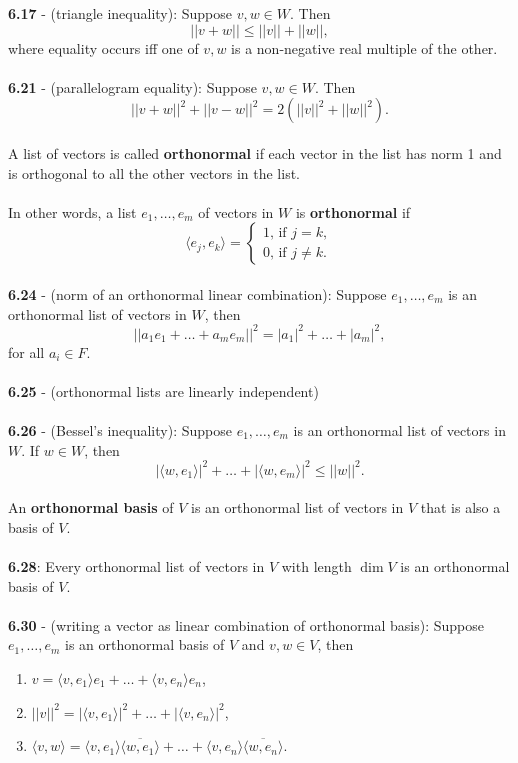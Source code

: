 \documentclass{article}
\DeclareMathOperator{\Dim}{dim}
\theoremstyle{definition}
\begin{document}
\textbf{6.17} - (triangle inequality): Suppose $v, w \in W$. Then $$||v + w|| \leq ||v|| + ||w||,$$ where equality occurs iff one of $v, w$ is a non-negative real multiple of the other. \\ \\
\textbf{6.21} - (parallelogram equality): Suppose $v, w \in W$. Then $$||v + w||^2 + ||v - w||^2 = 2(||v||^2 + ||w||^2).$$ \\
A list of vectors is called \textbf{orthonormal} if each vector in the list has norm 1 and is orthogonal to all the other vectors in the list. \\ \\
In other words, a list $e_1, \dots, e_m$ of vectors in $W$ is \textbf{orthonormal} if $$\langle e_j, e_k \rangle = \begin{cases} 1 \text{, if } j = k, \\
0 \text{, if } j \neq k.
\end{cases}$$ \\
\textbf{6.24} - (norm of an orthonormal linear combination): Suppose $e_1, \dots, e_m$ is an orthonormal list of vectors in $W$, then $$||a_1e_1 + \dots + a_me_m||^2 = |a_1|^2 + \dots + |a_m|^2,$$ for all $a_i \in F.$ \\ \\
\textbf{6.25} - (orthonormal lists are linearly independent) \\ \\
\textbf{6.26} - (Bessel’s inequality): Suppose $e_1, \dots, e_m$ is an orthonormal list of vectors in $W$. If $w \in W$, then $$|\langle w, e_1 \rangle|^2 + \dots + |\langle w, e_m \rangle|^2 \leq ||w||^2.$$ \\
An \textbf{orthonormal basis} of $V$ is an orthonormal list of vectors in $V$ that is also a basis of $V$. \\ \\
\textbf{6.28}: Every orthonormal list of vectors in $V$ with length $\Dim{V}$ is an orthonormal basis of $V$. \\ \\
\textbf{6.30} - (writing a vector as linear combination of orthonormal basis): Suppose $e_1, \dots, e_m$ is an orthonormal basis of $V$ and $v, w \in V$, then \begin{enumerate}
    \item $v = \langle v, e_1 \rangle e_1 + \dots + \langle v, e_n \rangle e_n$, 
    \item $||v||^2 = |\langle v, e_1 \rangle|^2 + \dots + |\langle v, e_n \rangle|^2$, 
    \item $\langle v, w \rangle = \langle v, e_1 \rangle \overline{\langle w, e_1 \rangle} + \dots + \langle v, e_n \rangle \overline{\langle w, e_n \rangle}$.
\end{enumerate} $ $ \\
\end{document}
